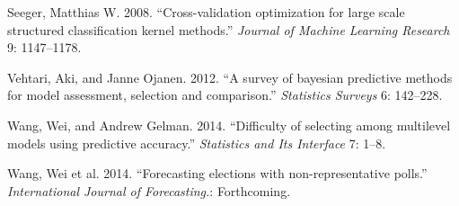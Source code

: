 \documentclass[11pt,article,oneside]{memoir}
\begin{document}
Seeger, Matthias W. 2008. ``Cross-validation optimization for large
scale structured classification kernel methods.'' \emph{Journal of
Machine Learning Research} 9: 1147--1178.

Vehtari, Aki, and Janne Ojanen. 2012. ``A survey of bayesian predictive
methods for model assessment, selection and comparison.''
\emph{Statistics Surveys} 6: 142--228.

Wang, Wei, and Andrew Gelman. 2014. ``Difficulty of selecting among
multilevel models using predictive accuracy.'' \emph{Statistics and Its
Interface} 7: 1--8.

Wang, Wei et al. 2014. ``Forecasting elections with non-representative
polls.'' \emph{International Journal of Forecasting.}: Forthcoming.
\end{document}
